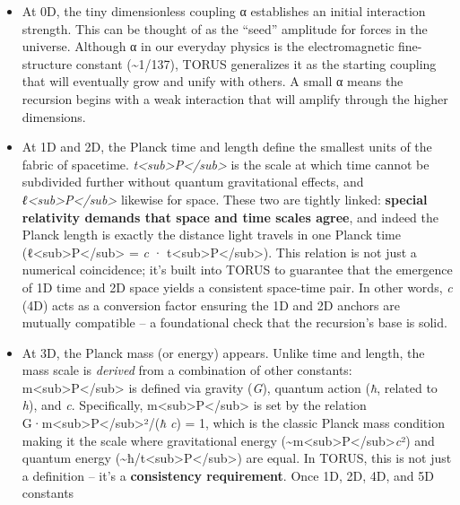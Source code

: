 \documentclass[
]{article}
\begin{document}
\begin{itemize}
\item
  At 0D, the tiny dimensionless coupling α establishes an initial
  interaction strength. This can be thought of as the ``seed'' amplitude
  for forces in the universe. Although α in our everyday physics is the
  electromagnetic fine-structure constant (\textasciitilde1/137), TORUS
  generalizes it as the starting coupling that will eventually grow and
  unify with others. A small α means the recursion begins with a weak
  interaction that will amplify through the higher dimensions.
\item
  At 1D and 2D, the Planck time and length define the smallest units of
  the fabric of spacetime.
  \emph{t\textless sub\textgreater P\textless/sub\textgreater{}} is the
  scale at which time cannot be subdivided further without quantum
  gravitational effects, and
  \emph{ℓ\textless sub\textgreater P\textless/sub\textgreater{}}
  likewise for space. These two are tightly linked: \textbf{special
  relativity demands that space and time scales agree}, and indeed the
  Planck length is exactly the distance light travels in one Planck time
  (ℓ\textless sub\textgreater P\textless/sub\textgreater{} = \emph{c} ·
  t\textless sub\textgreater P\textless/sub\textgreater)\hspace{0pt}.
  This relation is not just a numerical coincidence; it's built into
  TORUS to guarantee that the emergence of 1D time and 2D space yields a
  consistent space-time pair. In other words, \emph{c} (4D) acts as a
  conversion factor ensuring the 1D and 2D anchors are mutually
  compatible -- a foundational check that the recursion's base is solid.
\item
  At 3D, the Planck mass (or energy) appears. Unlike time and length,
  the mass scale is \emph{derived} from a combination of other
  constants: m\textless sub\textgreater P\textless/sub\textgreater{} is
  defined via gravity (\emph{G}), quantum action (\emph{ħ}, related to
  \emph{h}), and \emph{c}. Specifically,
  m\textless sub\textgreater P\textless/sub\textgreater{} is set by the
  relation
  G·m\textless sub\textgreater P\textless/sub\textgreater²/(\emph{ħ}
  \emph{c}) = 1, which is the classic Planck mass condition making it
  the scale where gravitational energy
  (\textasciitilde m\textless sub\textgreater P\textless/sub\textgreater{}\emph{c}²)
  and quantum energy
  (\textasciitilde ħ/t\textless sub\textgreater P\textless/sub\textgreater)
  are equal. In TORUS, this is not just a definition -- it's a
  \textbf{consistency requirement}. Once 1D, 2D, 4D, and 5D constants

\end{itemize}
\end{document}
